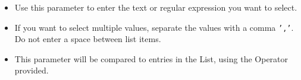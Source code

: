 \begin{itemize}
\item Use this parameter to enter the text or regular expression  you want to select.
\item If you want to select multiple values, separate the values with a comma {\tt ','}. Do not enter a space between list items. 
\item This parameter will be compared to entries in the List, using the Operator provided.
\end{itemize}

